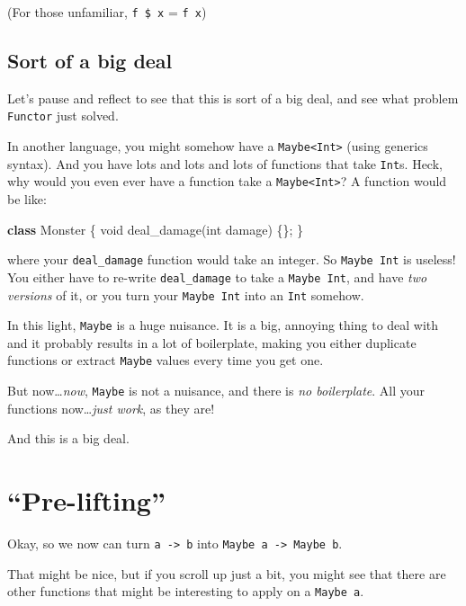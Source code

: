 \documentclass[]{article}
\newenvironment{Shaded}{}{}
\newcommand{\KeywordTok}[1]{\textcolor[rgb]{0.00,0.44,0.13}{\textbf{{#1}}}}
\newcommand{\DataTypeTok}[1]{\textcolor[rgb]{0.56,0.13,0.00}{{#1}}}
\newcommand{\FunctionTok}[1]{\textcolor[rgb]{0.02,0.16,0.49}{{#1}}}
\newcommand{\NormalTok}[1]{{#1}}
\begin{document}
(For those unfamiliar, \texttt{f\ \$\ x} = \texttt{f\ x})

\subsection{Sort of a big deal}\label{sort-of-a-big-deal}

Let's pause and reflect to see that this is sort of a big deal, and see
what problem \texttt{Functor} just solved.

In another language, you might somehow have a
\texttt{Maybe\textless{}Int\textgreater{}} (using generics syntax). And
you have lots and lots and lots of functions that take \texttt{Int}s.
Heck, why would you even ever have a function take a
\texttt{Maybe\textless{}Int\textgreater{}}? A function would be like:

\begin{Shaded}
\begin{Highlighting}[]
\KeywordTok{class} \NormalTok{Monster \{}
    \DataTypeTok{void} \FunctionTok{deal_damage}\NormalTok{(}\DataTypeTok{int} \NormalTok{damage) \{\};}
\NormalTok{\}}
\end{Highlighting}
\end{Shaded}

where your \texttt{deal\_damage} function would take an integer. So
\texttt{Maybe\ Int} is useless! You either have to re-write
\texttt{deal\_damage} to take a \texttt{Maybe\ Int}, and have \emph{two
versions} of it, or you turn your \texttt{Maybe\ Int} into an
\texttt{Int} somehow.

In this light, \texttt{Maybe} is a huge nuisance. It is a big, annoying
thing to deal with and it probably results in a lot of boilerplate,
making you either duplicate functions or extract \texttt{Maybe} values
every time you get one.

But now\ldots{}\emph{now}, \texttt{Maybe} is not a nuisance, and there
is \emph{no boilerplate}. All your functions now\ldots{}\emph{just
work}, as they are!

And this is a big deal.

\section{\texorpdfstring{``Pre-lifting''}{Pre-lifting}}\label{pre-lifting}

Okay, so we now can turn \texttt{a\ -\textgreater{}\ b} into
\texttt{Maybe\ a\ -\textgreater{}\ Maybe\ b}.

That might be nice, but if you scroll up just a bit, you might see that
there are other functions that might be interesting to apply on a
\texttt{Maybe\ a}.
\end{document}
